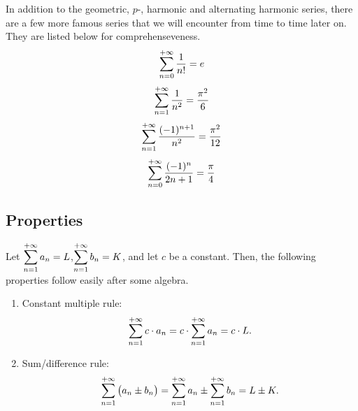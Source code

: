 In addition to the geometric, $p$-, harmonic and alternating harmonic series, there are a few more famous series that we will encounter from time to time later on. They are listed below for comprehenseveness.
\begin{equation}
    \displaystyle\sum_{n=0}^{+\infty} \frac1{n!} = e\end{equation}
\begin{equation}\displaystyle\sum_{n=1}^{+\infty} \frac1{n^2} = \frac{\pi^2}{6}\end{equation}
\begin{equation}\displaystyle\sum_{n=1}^{+\infty} \frac{(-1)^{n+1}}{n^2} = \frac{\pi^2}{12}\end{equation}
\begin{equation}\displaystyle\sum_{n=0}^{+\infty} \frac{(-1)^{n}}{2n+1} = \frac{\pi}{4}\end{equation}



\subsection{Properties}

Let \quad$\displaystyle \sum_{n=1}^{+\infty} a_n = L$,\quad  $\displaystyle\sum_{n=1}^{+\infty} b_n = K$, and let $c$ be a constant. Then, the following properties follow easily after some algebra. 
\begin{enumerate}
\item  Constant multiple rule: 
$$\displaystyle\sum_{n=1}^{+\infty} c\cdot a_n = c\cdot\sum_{n=1}^{+\infty} a_n = c\cdot L.$$
\item		Sum/difference rule: 
$$\displaystyle\sum_{n=1}^{+\infty} \big(a_n\pm b_n\big) = \sum_{n=1}^{+\infty} a_n \pm \sum_{n=1}^{+\infty} b_n = L \pm K.$$
\end{enumerate} 

